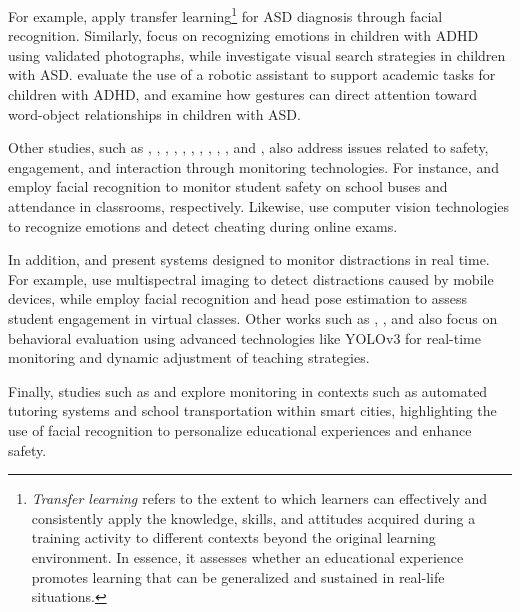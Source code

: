 			For example, \cite{Akter2021} apply transfer learning\footnote{\textit{Transfer learning \cite{Akter2021}} refers to the extent to which learners can effectively and consistently apply the knowledge, skills, and attitudes acquired during a training activity to different contexts beyond the original learning environment. In essence, it assesses whether an educational experience promotes learning that can be generalized and sustained in real-life situations.} for ASD diagnosis through facial recognition. Similarly, \cite{Pelc2006} focus on recognizing emotions in children with ADHD using validated photographs, while \cite{Albrecht2014} investigate visual search strategies in children with ASD. \cite{Berrezueta-Guzman2021} evaluate the use of a robotic assistant to support academic tasks for children with ADHD, and \cite{VilliersRader2021} examine how gestures can direct attention toward word-object relationships in children with ASD.
			
			Other studies, such as \cite{Boumiza2017}, \cite{DaCosta2023}, \cite{Enadula2021}, \cite{Farsani2020}, \cite{Hachad2020}, \cite{James2019}, \cite{Kulkarni2023}, \cite{Kumar2024Zoom}, \cite{Muller2018ArchnSmile}, \cite{Narkhede2023}, and \cite{Ozdamli2022}, also address issues related to safety, engagement, and interaction through monitoring technologies. For instance, \cite{Hachad2020} and \cite{James2019} employ facial recognition to monitor student safety on school buses and attendance in classrooms, respectively. Likewise, \cite{Ozdamli2022} use computer vision technologies to recognize emotions and detect cheating during online exams.
			
			In addition, \cite{Campbell2015Using} and \cite{Ucar2022Recognizing} present systems designed to monitor distractions in real time. For example, \cite{Campbell2015Using} use multispectral imaging to detect distractions caused by mobile devices, while \cite{Ucar2022Recognizing} employ facial recognition and head pose estimation to assess student engagement in virtual classes. Other works such as \cite{Argel2023Intellitell}, \cite{Erazo2016Easing}, and \cite{Nguyen2019} also focus on behavioral evaluation using advanced technologies like YOLOv3 for real-time monitoring and dynamic adjustment of teaching strategies.
			
			Finally, studies such as \cite{Boumiza2017} and \cite{DaCosta2023} explore monitoring in contexts such as automated tutoring systems and school transportation within smart cities, highlighting the use of facial recognition to personalize educational experiences and enhance safety.
			

